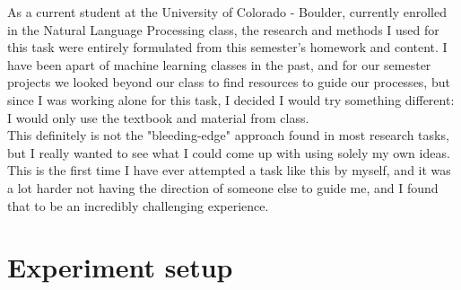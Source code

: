 \documentclass[11pt,a4paper]{article}
\begin{document}
As a current student at the University of Colorado - Boulder, currently enrolled in the Natural Language Processing
class, the research and methods I used for this task were entirely formulated from this semester's homework and 
content. I have been apart of machine learning classes in the past, and for our semester projects we looked beyond
our class to find resources to guide our processes, but since I was working alone for this task, I decided I would 
try something different: I would only use the textbook and material from class. \\
\indent This definitely is not the "bleeding-edge" approach found in most research tasks, but I really wanted 
to see what I could come up with using solely my own ideas. This is the first time I have ever attempted a task like
this by myself, and it was a lot harder not having the direction of someone else to guide me, and I found that to be
an incredibly challenging experience. 

\section{Experiment setup}
\end{document}
